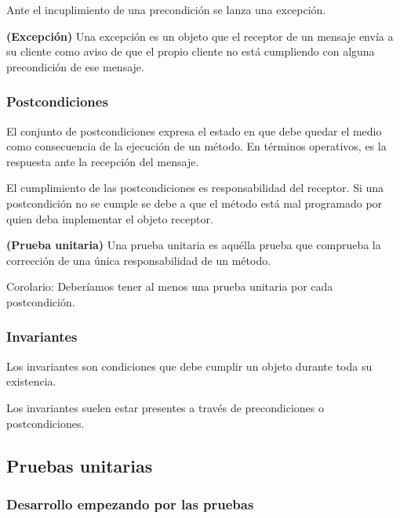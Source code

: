 \documentclass[../main.tex]{subfiles}
\begin{document}
            Ante el incuplimiento de una precondición se lanza una excepción.

            \begin{definition} \textbf{(Excepción)}
                Una excepción es un objeto que el receptor de un mensaje envía a su cliente como aviso de que el propio cliente no está cumpliendo con alguna precondición de ese mensaje.
            \end{definition}
            
        \subsubsection{Postcondiciones}
            El conjunto de postcondiciones expresa el estado en que debe quedar el medio como consecuencia de la ejecución de un método. En términos operativos, es la respuesta ante la recepción del mensaje.

            El cumplimiento de las postcondiciones es responsabilidad del receptor. Si una postcondición no se cumple se debe a que el método está mal programado por quien deba implementar el objeto receptor.
            
            \begin{definition} \textbf{(Prueba unitaria)}
                Una prueba unitaria es aquélla prueba que comprueba la corrección de una única responsabilidad de un método.

                Corolario: Deberíamos tener al menos una prueba unitaria por cada postcondición.
            \end{definition}
        
        \subsubsection{Invariantes}
            Los invariantes son condiciones que debe cumplir un objeto durante toda su existencia.

            Los invariantes suelen estar presentes a través de precondiciones o postcondiciones.

    \subsection{Pruebas unitarias}
        \subsubsection{Desarrollo empezando por las pruebas}
\end{document}
